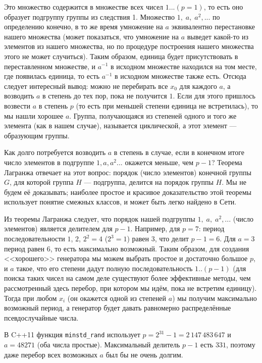 \documentclass{book}
\begin{document}
Это множество содержится в множестве всех чисел $1...(p=1)$, то есть оно образует
подгруппу группы из следствия 1. Множество $1,\; a,\; a^2, ...$ по определению конечно, в то же время умножение на $a$ эквивалентно
перестановке нашего множества (может показаться, что умножение на $a$ выведет какой-то из элементов
из нашего множества, но по процедуре построения нашего множества этого не может случиться).
Таким образом, единица будет присутствовать в переставленном
множестве, и $a^{-1}$ в исходном множестве находился на том месте, где появилась единица, то есть
$a^{-1}$ в исходном множестве также есть. Отсюда следует интересный вывод: можно не перебирать все $x_0$ для
каждого $a$, а возводить $a$ в степень до тех пор, пока не получится $1$. Если для этого
пришлось возвести $a$ в степень $p$ (то есть при меньшей степени единица не встретилась), то мы
нашли хорошее $a$. Группа, получающаяся из степеней одного и того же элемента (как в нашем случае),
называется циклической, а этот элемент --- образующим группы.

Как долго потребуется возводить $a$ в степень в случае, если в конечном итоге число элементов в
подгруппе $1, a, a^2...$ окажется меньше, чем $p - 1$?  Теорема Лагранжа отвечает на этот вопрос:
порядок (число элементов) конечной группы $G$, для которой группа $H$ --- подгруппа, делится на
порядок группы $H$. Мы не будем её доказывать; наиболее простое и красивое доказательство этой
теоремы использует понятие смежных классов, и может быть легко найдено в Сети.

Из теоремы Лагранжа следует, что порядок нашей подгруппы $1,\; a,\; a^2, ...$ (число элементов)
является делителем для $p - 1$. Например, для $p = 7$: период последовательности $1$, $2$, $2^2 =
4$ ($2^3 = 1$) равен $3$, что делит $p - 1 = 6$. Для $a = 3$ период равен $6$, то есть максимально
возможный.  Таким образом, для создания <<хорошего>> генератора мы можем выбрать простое и
достаточно большое $p$, и $a$ такое, что его степени дадут полную последовательность $1..(p - 1)$
(для поиска таких чисел на самом деле существуют более эффективные методы, чем рассмотренный здесь
перебор, при котором мы идём, пока не встретим единицу). Тогда при любом $x_i$ (он окажется одной
из степеней $a$) мы получим максимально возможный период, а генератор будет давать равномерно
распределённые псевдослучайные числа.

В C++11 функция \texttt{minstd_rand} использует $p = 2^{31} - 1 = 2\,147\,483\,647$ и $a =
48271$ (оба числа простые). Максимальный делитель $p - 1$ есть $331$, поэтому даже перебор всех
возможных $a$ был бы не очень долгим.
\end{document}
